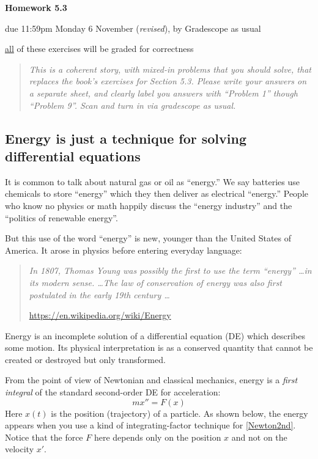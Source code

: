 \documentclass[12pt]{article}
\theoremstyle{definition}
\begin{document}
\renewcommand{\d}{\displaystyle}

\strut
\centerline{{\Large \textbf{Homework 5.3}}}

\bigskip
\centerline{{\large due 11:59pm Monday 6 November (\emph{revised}), by Gradescope as usual}}

\bigskip
\centerline{{\large \underline{all} of these exercises will be graded for correctness}}

\begin{quote}
\emph{This is a coherent story, with mixed-in problems that you should solve, that replaces the book's exercises for Section 5.3.  Please write your answers on a separate sheet, and clearly label you answers with ``Problem 1'' though ``Problem 9''.  Scan and turn in via gradescope as usual.}
\end{quote}

\noindent
\subsection*{Energy is just a technique for solving differential equations}

It is common to talk about natural gas or oil as ``energy.''   We say batteries use chemicals to store ``energy'' which they then deliver as electrical ``energy.''  People who know no physics or math happily discuss the ``energy industry'' and the ``politics of renewable energy''.

But this use of the word ``energy'' is new, younger than the United States of America.  It arose in physics before entering everyday language:

\small

\begin{quotation}
\noindent \emph{In 1807, Thomas Young was possibly the first to use the term ``energy'' \dots in its modern sense.  \dots  The law of conservation of energy was also first postulated in the early 19th century \dots}

\hfill \url{https://en.wikipedia.org/wiki/Energy}
\end{quotation}

\normalsize
Energy is an incomplete solution of a differential equation (DE) which describes some motion.  Its physical interpretation is as a conserved quantity that cannot be created or destroyed but only transformed.

From the point of view of Newtonian and classical mechanics, energy is a \emph{first integral} of the standard second-order DE for acceleration:
\begin{equation}
    mx''=F(x)  \label{Newton2nd}
\end{equation}
Here $x(t)$ is the position (trajectory) of a particle.  As shown below, the energy appears when you use a kind of integrating-factor technique for \eqref{Newton2nd}.  Notice that the force $F$ here depends only on the position $x$ and not on the velocity $x'$.
\end{document}
